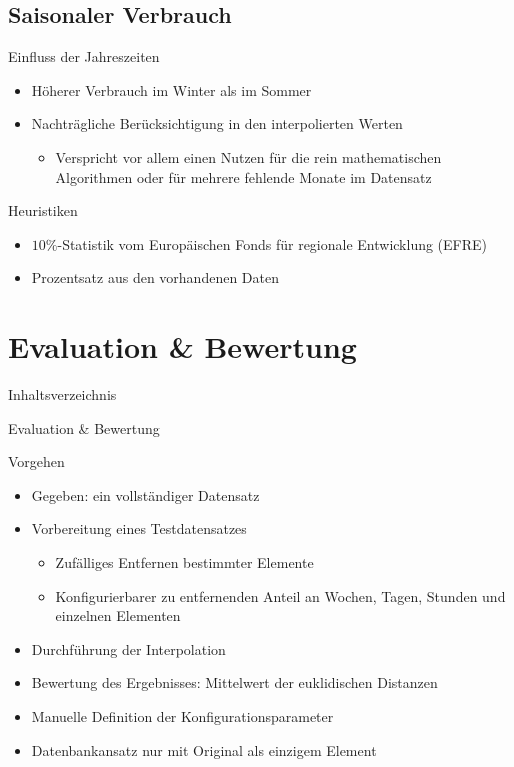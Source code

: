 \subsection{Saisonaler Verbrauch}
\begin{frame}{\insertsubsectionhead}
\begin{block}{Einfluss der Jahreszeiten}
\begin{itemize}
\item Höherer Verbrauch im Winter als im Sommer
\item Nachträgliche Berücksichtigung in den interpolierten Werten
\begin{itemize}
\item Verspricht vor allem einen Nutzen für die rein mathematischen Algorithmen oder für mehrere fehlende Monate im Datensatz
\end{itemize}
\end{itemize}
\end{block}
\begin{block}{Heuristiken}
\begin{itemize}
\item $10\%$-Statistik vom Europäischen Fonds für regionale Entwicklung (EFRE)
\item Prozentsatz aus den vorhandenen Daten
\end{itemize}
\end{block}
\end{frame}

\section{Evaluation \& Bewertung}
\begin{frame}{Inhaltsverzeichnis}
\tableofcontents[currentsection]
\end{frame}

\begin{frame}{Evaluation \& Bewertung}
\begin{block}{Vorgehen}
\begin{itemize}
	\item Gegeben: ein vollständiger Datensatz
	\item Vorbereitung eines Testdatensatzes
	\begin{itemize}
		\item Zufälliges Entfernen bestimmter Elemente
		\item Konfigurierbarer zu entfernenden Anteil an Wochen, Tagen, Stunden und einzelnen Elementen
	\end{itemize}
	\item Durchführung der Interpolation
	\item Bewertung des Ergebnisses: Mittelwert der euklidischen Distanzen
	\item Manuelle Definition der Konfigurationsparameter
	\item Datenbankansatz nur mit Original als einzigem Element
\end{itemize}
\end{block}
\end{frame}

